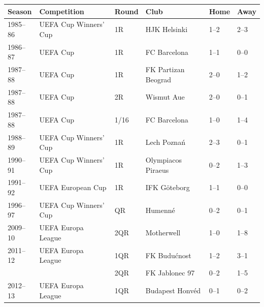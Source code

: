 \documentclass{article}
\begin{document}
\begin{tabular}{llllll}
\toprule
Season & Competition & Round & Club & Home & Away \\
\midrule
1985–86 & UEFA Cup Winners' Cup & 1R & HJK Helsinki & 1–2 & 2–3 \\
1986–87 & UEFA Cup & 1R & FC Barcelona & 1–1 & 0–0 \\
1987–88 & UEFA Cup & 1R & FK Partizan Beograd & 2–0 & 1–2 \\
1987–88 & UEFA Cup & 2R & Wismut Aue & 2–0 & 0–1 \\
1987–88 & UEFA Cup & 1/16 & FC Barcelona & 1–0 & 1–4 \\
1988–89 & UEFA Cup Winners' Cup & 1R & Lech Poznań & 2–3 & 0–1 \\
1990–91 & UEFA Cup Winners' Cup & 1R & Olympiacos Piraeus & 0–2 & 1–3 \\
1991–92 & UEFA European Cup & 1R & IFK Göteborg & 1–1 & 0–0 \\
1996–97 & UEFA Cup Winners' Cup & QR & Humenné & 0–2 & 0–1 \\
2009–10 & UEFA Europa League & 2QR & Motherwell & 1–0 & 1–8 \\
2011–12 & UEFA Europa League & 1QR & FK Budućnost & 1–2 & 3–1 \\
 &  & 2QR & FK Jablonec 97 & 0–2 & 1–5 \\
2012–13 & UEFA Europa League & 1QR & Budapest Honvéd & 0–1 & 0–2 \\
\bottomrule
\end{tabular}
\end{document}
